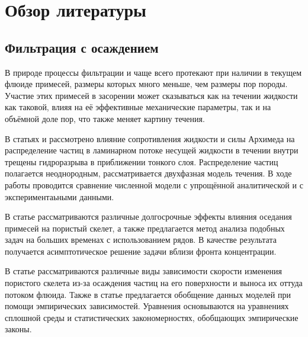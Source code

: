 \section{Обзор литературы}
\subsection{Фильтрация с осаждением}
\par В природе процессы фильтрации \cite{barenblatt} и \cite{basniev} чаще всего протекают при наличии в текущем флюиде примесей, размеры которых много меньше, чем размеры пор породы. Участие этих примесей в засорении может сказываться как на течении жидкости как таковой, влияя на её эффективные механические параметры, так и на объёмной доле пор, что также меняет картину течения. 
\par В статьях \cite{osiptsov_1} и \cite{osiptsov_2} рассмотрено влияние сопротивления жидкости и силы Архимеда на распределение частиц в ламинарном потоке несущей жидкости в течении внутри трещены гидроразрыва в приближении тонкого слоя. Распределение частиц полагается неоднородным, рассматривается двухфазная модель течения. В ходе работы проводится сравнение численной модели с упрощённой аналитической и с экспериментаьными данными.
\par В статье \cite{kuzmina} рассматриваются различные долгосрочные эффекты влияния оседания примесей на пористый скелет, а также предлагается метод анализа подобных задач на больших временах с использованием рядов. В качестве результата получается асимптотическое решение задачи вблизи фронта концентрации.
\par В статье \cite{civan} рассматриваются различные виды зависимости скорости изменения пористого скелета из-за  осаждения частиц на его поверхности и выноса их оттуда потоком флюида. Также в статье предлагается обобщение данных моделей при помощи эмпирических зависимостей. Уравнения основываются на уравнениях сплошной среды и статистических закономерностях, обобщающих эмпирические законы.
